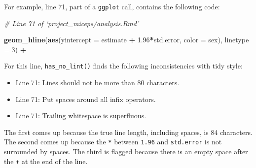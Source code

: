 \documentclass[12pt,twoside]{reedthesis}
\newenvironment{Shaded}{\begin{snugshade}}{\end{snugshade}}
\newcommand{\CommentTok}[1]{\textcolor[rgb]{0.56,0.35,0.01}{\textit{#1}}}
\newcommand{\DataTypeTok}[1]{\textcolor[rgb]{0.13,0.29,0.53}{#1}}
\newcommand{\DecValTok}[1]{\textcolor[rgb]{0.00,0.00,0.81}{#1}}
\newcommand{\FloatTok}[1]{\textcolor[rgb]{0.00,0.00,0.81}{#1}}
\newcommand{\KeywordTok}[1]{\textcolor[rgb]{0.13,0.29,0.53}{\textbf{#1}}}
\newcommand{\NormalTok}[1]{#1}
\newcommand{\OperatorTok}[1]{\textcolor[rgb]{0.81,0.36,0.00}{\textbf{#1}}}
\newcommand{\StringTok}[1]{\textcolor[rgb]{0.31,0.60,0.02}{#1}}
\begin{document}
For example, line 71, part of a \texttt{ggplot} call, contains the following code:
\begin{Shaded}
\begin{Highlighting}[]
\CommentTok{# Line 71 of `project_miceps/analysis.Rmd'}

\KeywordTok{geom_hline}\NormalTok{(}\KeywordTok{aes}\NormalTok{(}\DataTypeTok{yintercept =}\NormalTok{ estimate }\OperatorTok{+}\StringTok{ }\FloatTok{1.96}\OperatorTok{*}\NormalTok{std.error, }\DataTypeTok{color =}\NormalTok{ sex), }\DataTypeTok{linetype =} \DecValTok{3}\NormalTok{) }\OperatorTok{+}\StringTok{ }
\end{Highlighting}
\end{Shaded}
For this line, \texttt{has\_no\_lint()} finds the following inconsistencies with tidy style:
\begin{itemize}
\item
  Line 71: Lines should not be more than 80 characters.
\item
  Line 71: Put spaces around all infix operators.
\item
  Line 71: Trailing whitespace is superfluous.
\end{itemize}
The first comes up because the true line length, including spaces, is 84 characters. The second comes up because the \texttt{*} between \texttt{1.96} and \texttt{std.error} is not surrounded by spaces. The third is flagged because there is an empty space after the \texttt{+} at the end of the line.
\end{document}
